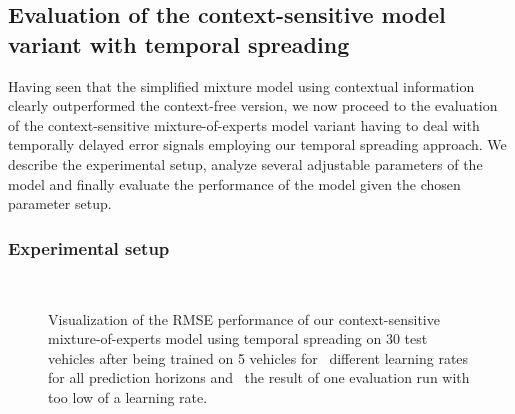 \subsection{Evaluation of the context-sensitive model variant with temporal spreading}%
\label{subsec:evaluation_of_the_context_sensitive_model_variant_with_temporal_spreading}

Having seen that the simplified mixture model using contextual information clearly outperformed the context-free version, we now proceed to the evaluation of the context-sensitive mixture-of-experts model variant having to deal with temporally delayed error signals employing our temporal spreading approach.
We describe the experimental setup, analyze several adjustable parameters of the model and finally evaluate the performance of the model given the chosen parameter setup.

\subsubsection{Experimental setup}%
\label{ssubsec:experimental_setup}

\begin{figure}[t]
    \centering
    \\
    \caption{Visualization of the \ac{RMSE} performance of our context-sensitive mixture-of-experts model using temporal spreading on \num{30} test vehicles after being trained on \num{5} vehicles for~\protect{} different learning rates for all prediction horizons and~\protect{} the result of one evaluation run with too low of a learning rate.}
    \label{fig:mix_parameters1}
\end{figure}

